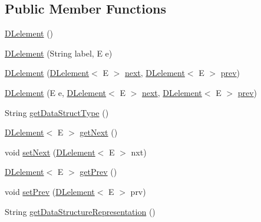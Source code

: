 \subsection*{Public Member Functions}
\begin{DoxyCompactItemize}
\item 
\mbox{\hyperlink{classbridges_1_1base_1_1_d_lelement_a525b572340e161d9c430baff10b64ab2}{D\+Lelement}} ()
\item 
\mbox{\hyperlink{classbridges_1_1base_1_1_d_lelement_a6aa1d4a3dad4a196c2ed079d108562bc}{D\+Lelement}} (String label, E e)
\item 
\mbox{\hyperlink{classbridges_1_1base_1_1_d_lelement_ab1e4eace66bb1b097463c4f04e964cd0}{D\+Lelement}} (\mbox{\hyperlink{classbridges_1_1base_1_1_d_lelement}{D\+Lelement}}$<$ E $>$ \mbox{\hyperlink{classbridges_1_1base_1_1_s_lelement_abf61c96a74ad319d561c6952ea388e0e}{next}}, \mbox{\hyperlink{classbridges_1_1base_1_1_d_lelement}{D\+Lelement}}$<$ E $>$ \mbox{\hyperlink{classbridges_1_1base_1_1_d_lelement_a6eba4876f820b75ac6bde01d7dea9da7}{prev}})
\item 
\mbox{\hyperlink{classbridges_1_1base_1_1_d_lelement_a3ffba30204a2ea6939b07b0ded123af5}{D\+Lelement}} (E e, \mbox{\hyperlink{classbridges_1_1base_1_1_d_lelement}{D\+Lelement}}$<$ E $>$ \mbox{\hyperlink{classbridges_1_1base_1_1_s_lelement_abf61c96a74ad319d561c6952ea388e0e}{next}}, \mbox{\hyperlink{classbridges_1_1base_1_1_d_lelement}{D\+Lelement}}$<$ E $>$ \mbox{\hyperlink{classbridges_1_1base_1_1_d_lelement_a6eba4876f820b75ac6bde01d7dea9da7}{prev}})
\item 
String \mbox{\hyperlink{classbridges_1_1base_1_1_d_lelement_a4a0e8f7bd377a652927a741e70aae6d3}{get\+Data\+Struct\+Type}} ()
\item 
\mbox{\hyperlink{classbridges_1_1base_1_1_d_lelement}{D\+Lelement}}$<$ E $>$ \mbox{\hyperlink{classbridges_1_1base_1_1_d_lelement_a35e88e8d991d6f23ec63b3ef3f6cce4e}{get\+Next}} ()
\item 
void \mbox{\hyperlink{classbridges_1_1base_1_1_d_lelement_aa18aff21854e4fe372dfefef04b325fe}{set\+Next}} (\mbox{\hyperlink{classbridges_1_1base_1_1_d_lelement}{D\+Lelement}}$<$ E $>$ nxt)
\item 
\mbox{\hyperlink{classbridges_1_1base_1_1_d_lelement}{D\+Lelement}}$<$ E $>$ \mbox{\hyperlink{classbridges_1_1base_1_1_d_lelement_a859f08f38513ecdfff0eb11bd2b98ce7}{get\+Prev}} ()
\item 
void \mbox{\hyperlink{classbridges_1_1base_1_1_d_lelement_a152a06add922290d48b2d4affc87d592}{set\+Prev}} (\mbox{\hyperlink{classbridges_1_1base_1_1_d_lelement}{D\+Lelement}}$<$ E $>$ prv)
\item 
String \mbox{\hyperlink{classbridges_1_1base_1_1_d_lelement_aefe2e582992a9e574d733f109add80f2}{get\+Data\+Structure\+Representation}} ()
\end{DoxyCompactItemize}
